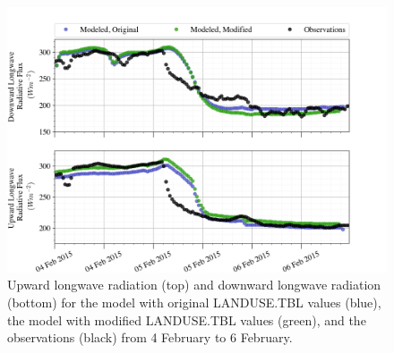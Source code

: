 \begin{figure}[h]
    \centering
    \doublespacing
    \includegraphics[width=1\linewidth]{figures/chapter6/case1_lw_sw.png}
    \caption[Idealized Case 1 - Longwave radiation.]{Upward longwave radiation (top) and downward longwave radiation (bottom) for the model with original LANDUSE.TBL values (blue), the model with modified LANDUSE.TBL values (green), and the observations (black) from 4 February to 6 February.}
    \label{fig:c1:radiative}
\end{figure}

